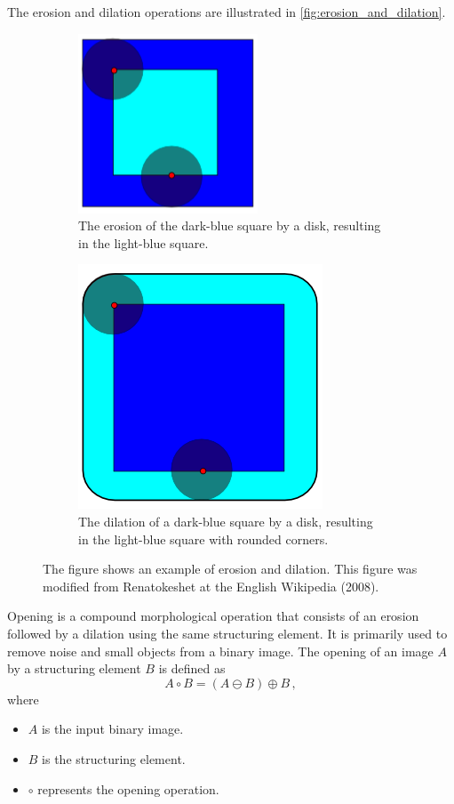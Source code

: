 The erosion and dilation operations are illustrated in \autoref{fig:erosion_and_dilation}.
\begin{figure}[h]
    \centering
    \begin{subfigure}[t]{0.45\textwidth}
        \centering
        \includegraphics[width=0.5\linewidth]{figures/detection/erosion.png}
        \caption{The erosion of the dark-blue square by a disk, resulting in the light-blue square.}
        \label{fig:erosion}
    \end{subfigure}
    \quad
    \begin{subfigure}[t]{0.45\textwidth}
        \centering
        \includegraphics[width=0.5\linewidth]{figures/detection/dilation.png}
        \caption{The dilation of a dark-blue square by a disk, resulting in the light-blue square with rounded corners.}
        \label{fig:dilation}
    \end{subfigure}
    \caption{The figure shows an example of erosion and dilation. This figure was modified from Renatokeshet at the English Wikipedia (2008).}
    \label{fig:erosion_and_dilation}
\end{figure}

Opening is a compound morphological operation that consists of an erosion followed by a dilation using the same structuring element. It is primarily used to remove noise and small objects from a binary image. The opening of an image $A$ by a structuring element $B$ is defined as
\begin{equation}
    A \circ B = (A \ominus B) \oplus B\,,
    \label{eq:opening}
\end{equation}
where
\begin{itemize}
    \item $A$ is the input binary image.
    \item $B$ is the structuring element.
    \item $\circ$ represents the opening operation.
\end{itemize}

